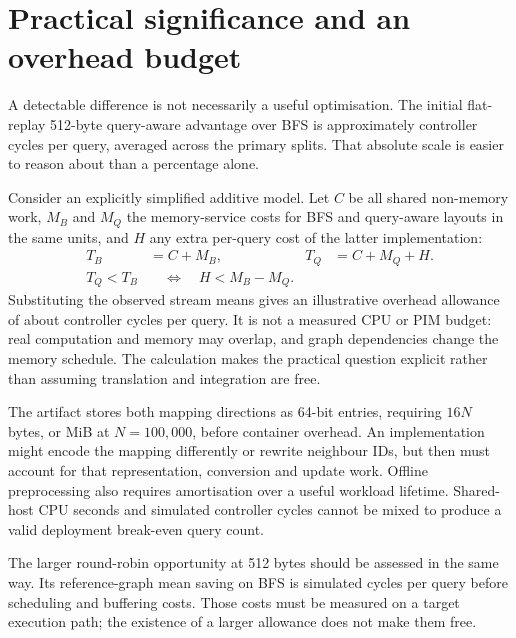 \documentclass[11pt,a4paper]{report}
\begin{document}
\section{Practical significance and an overhead budget}
A detectable difference is not necessarily a useful optimisation. The initial flat-replay 512-byte query-aware advantage over BFS is approximately \SavedCyclesPerQuery{} controller cycles per query, averaged across the primary splits. That absolute scale is easier to reason about than a percentage alone.

Consider an explicitly simplified additive model. Let $C$ be all shared non-memory work, $M_B$ and $M_Q$ the memory-service costs for BFS and query-aware layouts in the same units, and $H$ any extra per-query cost of the latter implementation:
\begin{align}
 T_B &= C+M_B, & T_Q &= C+M_Q+H.\\
 T_Q<T_B &\quad\Longleftrightarrow\quad H<M_B-M_Q.
\end{align}
Substituting the observed stream means gives an illustrative overhead allowance of about \SavedCyclesPerQuery{} controller cycles per query. It is not a measured CPU or PIM budget: real computation and memory may overlap, and graph dependencies change the memory schedule. The calculation makes the practical question explicit rather than assuming translation and integration are free.

The artifact stores both mapping directions as 64-bit entries, requiring $16N$ bytes, or \MappingMiB{} MiB at $N=100{,}000$, before container overhead. An implementation might encode the mapping differently or rewrite neighbour IDs, but then must account for that representation, conversion and update work. Offline preprocessing also requires amortisation over a useful workload lifetime. Shared-host CPU seconds and simulated controller cycles cannot be mixed to produce a valid deployment break-even query count.

The larger round-robin opportunity at 512 bytes should be assessed in the same way. Its reference-graph mean saving on BFS is \RoundRobinBFSSavedFloat{} simulated cycles per query before scheduling and buffering costs. Those costs must be measured on a target execution path; the existence of a larger allowance does not make them free.
\end{document}
